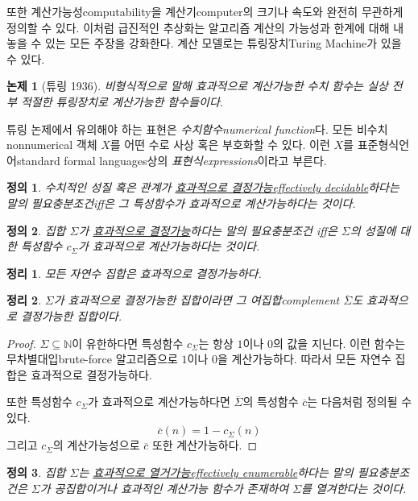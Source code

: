 \documentclass[a4paper,chapter,atbegshi]{oblivoir}
\newtheorem{defn}{정의}[chapter]
\newtheorem{theo}{정리}[chapter]
\newtheorem{thes}{논제}[chapter]
\begin{document}
또한 계산가능성{\tiny computability}을 계산기{\tiny computer}의 크기나 속도와
완전히 무관하게 정의할 수 있다. 이처럼 급진적인 추상화는 알고리즘 계산의
가능성과 한계에 대해 내놓을 수 있는 모든 주장을 강화한다. 계산 모델로는
튜링장치{\tiny Turing Machine}가 있을 수 있다.
\begin{thes}[튜링 1936]
  비형식적으로 말해 효과적으로 계산가능한 수치 함수는 실상 전부 적절한 튜링장치로
  계산가능한 함수들이다.
\end{thes}
튜링 논제에서 유의해야 하는 표현은 \emph{수치함수\tiny numerical function}다. 
모든 비수치{\tiny nonnumerical} 객체 $X$를 어떤 수로 사상 혹은 부호화할 수 있다.
이런 $X$를 표준형식언어{\tiny standard formal languages}상의 
\emph{표현식\tiny expressions}이라고 부른다.
\begin{defn}
  수치적인 성질 혹은 관계가 \underline{효과적으로 결정가능\tiny effectively
  decidable}하다는 말의 필요충분조건{\tiny iff}은 그 특성함수가 효과적으로
  계산가능하다는 것이다.
\end{defn}
\begin{defn}
  집합 $\Sigma$가 \underline{효과적으로 결정가능}하다는 말의 필요충분조건{\tiny
  iff}은 $\Sigma$의 성질에 대한 특성함수 $c_{\Sigma}$가 효과적으로 계산가능하다는
  것이다.
\end{defn}
\begin{theo}
  모든 자연수 집합은 효과적으로 결정가능하다.
\end{theo}
\begin{theo}\label{theo:14}
  $\Sigma$가 효과적으로 결정가능한 집합이라면 그 여집합{\tiny complement}
  $\overline{\Sigma}$도 효과적으로 결정가능한 집합이다.
\end{theo}
\begin{proof}
  $\Sigma\subseteq\mathbb{N}$이 유한하다면 특성함수 $c_{\Sigma}$는 항상 $1$이나
  $0$의 값을 지닌다. 이런 함수는 무차별대입{\tiny brute-force} 알고리즘으로
  $1$이나 $0$을 계산가능하다. 따라서 모든 자연수 집합은 효과적으로 결정가능하다.

  또한 특성함수 $c_{\Sigma}$가 효과적으로 계산가능하다면 $\overline{\Sigma}$의
  특성함수 $\overline{c}$는 다음처럼 정의될 수 있다.
  \[
    \overline{c}(n) = 1-c_{\Sigma}(n)
  \]
  그리고 $c_{\Sigma}$의 계산가능성으로 $\overline{c}$ 또한 계산가능하다.
\end{proof}
\begin{defn}
  집합 $\Sigma$는 \underline{효과적으로 열거가능\tiny effectively 
  enumerable}하다는 말의 필요충분조건은 $\Sigma$가 공집합이거나 
  효과적인 계산가능 함수가 존재하여 $\Sigma$를 열겨한다는 것이다.
\end{defn}
\end{document}
